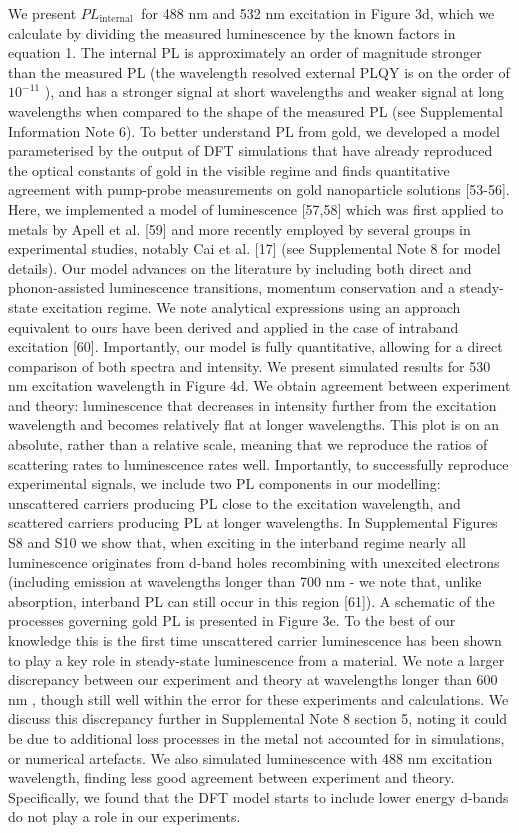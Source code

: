 \documentclass[10pt]{article}
\begin{document}
We present $P L_{\text {internal }}$ for 488 nm and 532 nm excitation in Figure 3d, which we calculate by dividing the measured luminescence by the known factors in equation 1. The internal PL is approximately an order of magnitude stronger than the measured PL (the wavelength resolved external PLQY is on the order of $10^{-11}$ ), and has a stronger signal at short wavelengths and weaker signal at long wavelengths when compared to the shape of the measured PL (see Supplemental Information Note 6). To better understand PL from gold, we developed a model parameterised by the output of DFT simulations that have already reproduced the optical constants of gold in the visible regime and finds quantitative\\[0pt]
agreement with pump-probe measurements on gold nanoparticle solutions [53-56]. Here, we implemented a model of luminescence [57,58] which was first applied to metals by Apell et al. [59] and more recently employed by several groups in experimental studies, notably Cai et al. [17] (see Supplemental Note 8 for model details). Our model advances on the literature by including both direct and phonon-assisted luminescence transitions, momentum conservation and a steady-state excitation regime. We note analytical expressions using an approach equivalent to ours have been derived and applied in the case of intraband excitation [60]. Importantly, our model is fully quantitative, allowing for a direct comparison of both spectra and intensity. We present simulated results for 530 nm excitation wavelength in Figure 4d. We obtain agreement between experiment and theory: luminescence that decreases in intensity further from the excitation wavelength and becomes relatively flat at longer wavelengths. This plot is on an absolute, rather than a relative scale, meaning that we reproduce the ratios of scattering rates to luminescence rates well. Importantly, to successfully reproduce experimental signals, we include two PL components in our modelling: unscattered carriers producing PL close to the excitation wavelength, and scattered carriers producing PL at longer wavelengths. In Supplemental Figures S8 and S10 we show that, when exciting in the interband regime nearly all luminescence originates from d-band holes recombining with unexcited electrons (including emission at wavelengths longer than 700 nm - we note that, unlike absorption, interband PL can still occur in this region [61]). A schematic of the processes governing gold PL is presented in Figure 3e. To the best of our knowledge this is the first time unscattered carrier luminescence has been shown to play a key role in steady-state luminescence from a material. We note a larger discrepancy between our experiment and theory at wavelengths longer than 600 nm , though still well within the error for these experiments and calculations. We discuss this discrepancy further in Supplemental Note 8 section 5, noting it could be due to additional loss processes in the metal not accounted for in simulations, or numerical artefacts. We also simulated luminescence with 488 nm excitation wavelength, finding less good agreement between experiment and theory. Specifically, we found that the DFT model starts to include lower energy d-bands do not play a role in our experiments. 
\end{document}

